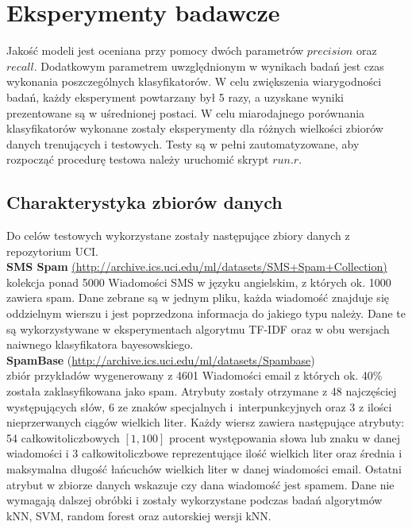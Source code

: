 \documentclass[a4paper, 10pt]{article}
\begin{document}
\section{Eksperymenty badawcze}


Jakość modeli jest oceniana przy pomocy dwóch parametrów $precision$ oraz $recall$. Dodatkowym 
parametrem uwzględnionym w wynikach badań jest czas wykonania poszczególnych klasyfikatorów. 
W celu zwiększenia wiarygodności badań, każdy eksperyment powtarzany był 5 razy, a uzyskane wyniki prezentowane 
są w uśrednionej postaci. W celu miarodajnego porównania klasyfikatorów wykonane zostały eksperymenty dla różnych wielkości 
zbiorów danych trenujących i testowych. Testy są w pełni zautomatyzowane, aby rozpocząć procedurę testowa należy uruchomić skrypt 
$run.r$.






	\subsection{Charakterystyka zbiorów danych}
	
Do celów testowych wykorzystane zostały następujące zbiory danych z repozytorium UCI.\\

\textbf{SMS Spam} \url{(http://archive.ics.uci.edu/ml/datasets/SMS+Spam+Collection)} \\ kolekcja ponad 5000 Wiadomości SMS w języku angielskim, z których ok. 1000 zawiera spam. Dane zebrane są w jednym pliku, każda wiadomość znajduje się oddzielnym wierszu i 
jest poprzedzona informacja do jakiego typu należy. Dane te są wykorzystywane w eksperymentach algorytmu TF-IDF oraz w obu wersjach naiwnego klasyfikatora bayesowskiego. \\

\textbf{SpamBase} (\url{http://archive.ics.uci.edu/ml/datasets/Spambase}) \\ zbiór przykładów wygenerowany z 4601 Wiadomości email z których ok. 40\% została zaklasyfikowana jako spam. Atrybuty zostały otrzymane z 48 najczęściej występujących słów, 
6 ze znaków specjalnych i~interpunkcyjnych oraz 3 z ilości nieprzerwanych ciągów wielkich liter.  Każdy wiersz zawiera następujące atrybuty: 54 całkowitoliczbowych $[1,100]$ procent występowania słowa lub znaku w danej wiadomości 
i 3 całkowitoliczbowe reprezentujące ilość wielkich liter oraz średnia i maksymalna długość łańcuchów wielkich liter w danej wiadomości email. Ostatni atrybut w zbiorze danych wskazuje czy dana wiadomość jest spamem. 
Dane nie wymagają dalszej obróbki i zostały wykorzystane podczas badań 	algorytmów kNN, SVM, random forest oraz autorskiej wersji kNN.
	
\end{document}
